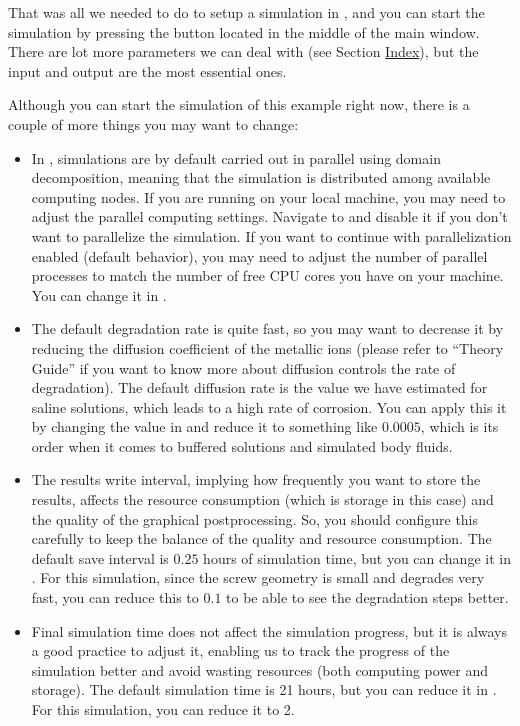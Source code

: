 That was all we needed to do to setup a simulation in \biodeg{}, and you can start the simulation by pressing the  button located in the middle of the main window. There are lot more parameters we can deal with (see Section \hyperref[sec:index]{Index}), but the input and output are the most essential ones. 

Although you can start the simulation of this example right now, there is a couple of more things you may want to change:

\begin{itemize}
\item
In \biodeg{}, simulations are by default carried out in parallel using domain decomposition, meaning that the simulation is distributed among available computing nodes. If you are running \biodeg{} on your local machine, you may need to adjust the parallel computing settings. Navigate to  and disable it if you don't want to parallelize the simulation. If you want to continue with parallelization enabled (default behavior), you may need to adjust the number of parallel processes to match the number of free CPU cores you have on your machine. You can change it in . 
\item
The default degradation rate is quite fast, so you may want to decrease it by reducing the diffusion coefficient of the metallic ions (please refer to ``Theory Guide'' if you want to know more about diffusion controls the rate of degradation). The default diffusion rate is the value we have estimated for saline solutions, which leads to a high rate of corrosion. You can apply this it by changing the value in  and reduce it to something like $0.0005$, which is its order when it comes to buffered solutions and simulated body fluids.
\item
The results write interval, implying how frequently you want to store the results, affects the resource consumption (which is storage in this case) and the quality of the graphical postprocessing. So, you should configure this carefully to keep the balance of the quality and resource consumption. The default save interval is $0.25$ hours of simulation time, but you can change it in . For this simulation, since the screw geometry is small and degrades very fast, you can reduce this to $0.1$ to be able to see the degradation steps better.
\item
Final simulation time does not affect the simulation progress, but it is always a good practice to adjust it, enabling us to track the progress of the simulation better and avoid wasting resources (both computing power and storage). The default simulation time is 21 hours, but you can reduce it in . For this simulation, you can reduce it to 2.
\end{itemize}

